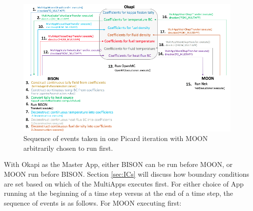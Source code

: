 \documentclass[10pt]{article}
\numberwithin{equation}{section} %
\begin{document}
\begin{figure}[H]
\centering
\includegraphics[width=17.5cm]{figures/OpenMC-BISON-Nek-complicated.png}
\caption{Sequence of events taken in one Picard iteration with MOON arbitrarily chosen to run first.}
\end{figure}

With Okapi as the Master App, either BISON can be run before MOON, or MOON run before BISON. Section \ref{sec:ICs} will discuss how boundary conditions are set based on which of the MultiApps executes first. For either choice of App running at the beginning of a time step versus at the end of a time step, the sequence of events is as follows. For MOON executing first:
\end{document}
